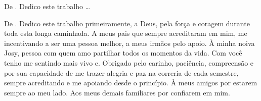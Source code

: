\begin{dedicatoria}
\vspace*{\fill}
\vspace*{\fill}
\vspace*{\fill}
\vspace*{\fill}
\vspace*{\fill}
\vspace*{\fill}
De \imprimirAutorUm.
\newline
Dedico este trabalho \ldots 

\vspace*{\fill}
De \imprimirAutorDois.
\newline
Dedico este trabalho primeiramente, a Deus, pela força e coragem durante toda esta longa caminhada. A meus pais que sempre acreditaram em mim, me incentivando a ser uma pessoa melhor, a meus irmãos pelo apoio. À minha noiva Josy, pessoa com quem amo partilhar todos os momentos da vida. Com você tenho me sentindo mais vivo e. Obrigado pelo carinho, paciência, compreensão e por sua capacidade de me trazer alegria e paz na correria de cada semestre, sempre acreditando e me apoiando desde o princípio. À meus amigos por estarem sempre ao meu lado. Aos meus demais familiares por confiarem em mim.
\end{dedicatoria}
